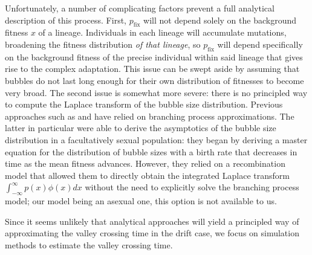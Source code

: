 \documentclass[10pt,twocolumn,twoside]{gsajnl}
\newcommand{\pfix}{p_{\mathrm{fix}}}
\begin{document}
\begin{spacing}{1.5}
Unfortunately, a number of complicating factors prevent a full analytical description of this process.
First, $\pfix$ will not depend solely on the background fitness $x$ of a lineage.
Individuals in each lineage will accumulate mutations, broadening the fitness distribution \emph{of that lineage}, so $\pfix$ will depend specifically on the background fitness of the precise individual within said lineage that gives rise to the complex adaptation.
This issue can be swept aside by assuming that bubbles do not last long enough for their own distribution of fitnesses to become very broad.
The second issue is somewhat more severe: there is no principled way to compute the Laplace transform of the bubble size distribution.
Previous approaches such as \citet{weissman_2009} and \citet{neher_shraiman_2011} have relied on branching process approximations.
The latter in particular were able to derive the asymptotics of the bubble size distribution in a facultatively sexual population: they began by deriving a master equation for the distribution of bubble sizes with a birth rate that decreases in time as the mean fitness advances.
However, they relied on a recombination model that allowed them to directly obtain the integrated Laplace transform $\int_{-\infty}^\infty p(x) \phi(x) dx$ without the need to explicitly solve the branching process model; our model being an asexual one, this option is not available to us.

Since it seems unlikely that analytical approaches will yield a principled way of approximating the valley crossing time in the drift case, we focus on simulation methods to estimate the valley crossing time.



\end{spacing}
\end{document}
